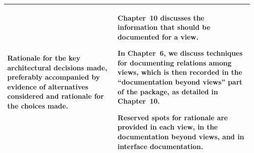 \documentclass[11pt]{article}
\begin{document}
\begin{longtable}{@{}%
  >{\raggedright\arraybackslash}p{}%
  >{\raggedright\arraybackslash}p{}@{}}
Rationale for the key architectural decisions made, preferably accompanied by
evidence of alternatives considered and rationale for the choices made. &
Chapter~10 discusses the information that should be documented for a view.

In Chapter~6, we discuss techniques for documenting relations among views,
which is then recorded in the ``documentation beyond views'' part of the
package, as detailed in Chapter~10.

Reserved spots for rationale are provided in each view, in the documentation
beyond views, and in interface documentation. \\
\bottomrule
\end{longtable}
\end{document}
